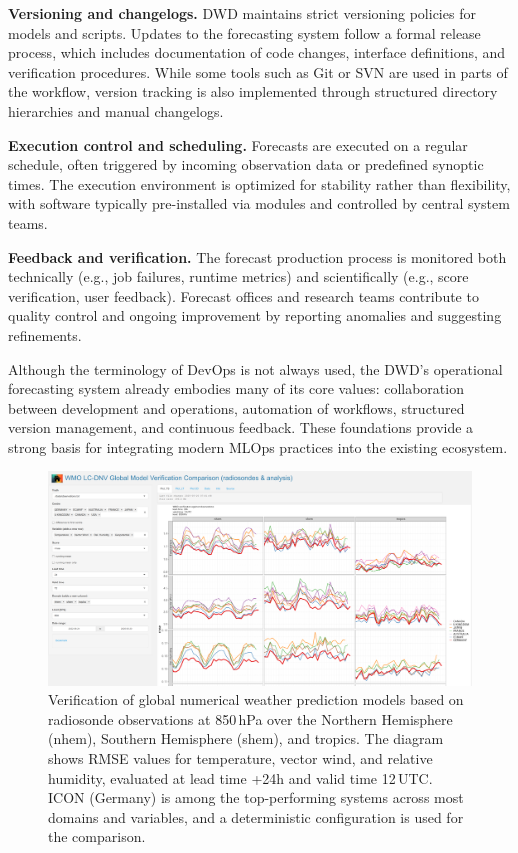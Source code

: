 {\bf Versioning and changelogs.} DWD maintains strict versioning policies for models and scripts. Updates to the forecasting system follow a formal release process, which includes documentation of code changes, interface definitions, and verification procedures. While some tools such as Git or SVN are used in parts of the workflow, version tracking is also implemented through structured directory hierarchies and manual changelogs.

{\bf Execution control and scheduling.} Forecasts are executed on a regular schedule, often triggered by incoming observation data or predefined synoptic times. The execution environment is optimized for stability rather than flexibility, with software typically pre-installed via modules and controlled by central system teams.

{\bf Feedback and verification.} The forecast production process is monitored both technically (e.g., job failures, runtime metrics) and scientifically (e.g., score verification, user feedback). Forecast offices and research teams contribute to quality control and ongoing improvement by reporting anomalies and suggesting refinements.

Although the terminology of DevOps is not always used, the DWD’s operational forecasting system already embodies many of its core values: collaboration between development and operations, automation of workflows, structured version management, and continuous feedback. These foundations provide a strong basis for integrating modern MLOps practices into the existing ecosystem.

\begin{figure}[ht]
	\centering
	\includegraphics[width=\textwidth]{images/ICON_verification_Radiosondes.png}
	\caption{Verification of global numerical weather prediction models based on radiosonde observations at 850\,hPa over the Northern Hemisphere (nhem), Southern Hemisphere (shem), and tropics. The diagram shows RMSE values for temperature, vector wind, and relative humidity, evaluated at lead time +24h and valid time 12\,UTC. ICON (Germany) is among the top-performing systems across most domains and variables, and a deterministic configuration is used for the comparison.}
	\label{fig:icon_verification_radiosondes}
\end{figure}

